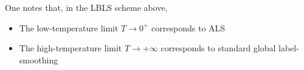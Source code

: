 One notes that, in the LBLS scheme above,
\begin{itemize}
\item The low-temperature limit $T \rightarrow 0^+$ corresponds to ALS
\item The high-temperature limit $T \rightarrow +\infty$ corresponds to standard
  global label-smoothing
\end{itemize}





